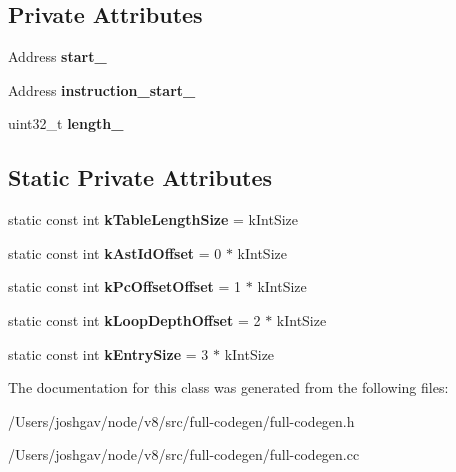 \subsection*{Private Attributes}
\begin{DoxyCompactItemize}
\item 
Address {\bfseries start\+\_\+}\hypertarget{classv8_1_1internal_1_1_back_edge_table_a86e3b0df2bfec3bf09926f74e6f195f7}{}\label{classv8_1_1internal_1_1_back_edge_table_a86e3b0df2bfec3bf09926f74e6f195f7}

\item 
Address {\bfseries instruction\+\_\+start\+\_\+}\hypertarget{classv8_1_1internal_1_1_back_edge_table_ac8756e080b323779682b70c98dc1fc76}{}\label{classv8_1_1internal_1_1_back_edge_table_ac8756e080b323779682b70c98dc1fc76}

\item 
uint32\+\_\+t {\bfseries length\+\_\+}\hypertarget{classv8_1_1internal_1_1_back_edge_table_aba88bdc9f658e964e5a8235a7e0a7a93}{}\label{classv8_1_1internal_1_1_back_edge_table_aba88bdc9f658e964e5a8235a7e0a7a93}

\end{DoxyCompactItemize}
\subsection*{Static Private Attributes}
\begin{DoxyCompactItemize}
\item 
static const int {\bfseries k\+Table\+Length\+Size} = k\+Int\+Size\hypertarget{classv8_1_1internal_1_1_back_edge_table_a1f8f0dc1cc15c8ef32bb1165fdc80dde}{}\label{classv8_1_1internal_1_1_back_edge_table_a1f8f0dc1cc15c8ef32bb1165fdc80dde}

\item 
static const int {\bfseries k\+Ast\+Id\+Offset} = 0 $\ast$ k\+Int\+Size\hypertarget{classv8_1_1internal_1_1_back_edge_table_aad51f56ec7f0d83e8f927664dd29783b}{}\label{classv8_1_1internal_1_1_back_edge_table_aad51f56ec7f0d83e8f927664dd29783b}

\item 
static const int {\bfseries k\+Pc\+Offset\+Offset} = 1 $\ast$ k\+Int\+Size\hypertarget{classv8_1_1internal_1_1_back_edge_table_aae9efd04afbab2db5e68a1cd2f4a7d3b}{}\label{classv8_1_1internal_1_1_back_edge_table_aae9efd04afbab2db5e68a1cd2f4a7d3b}

\item 
static const int {\bfseries k\+Loop\+Depth\+Offset} = 2 $\ast$ k\+Int\+Size\hypertarget{classv8_1_1internal_1_1_back_edge_table_a1847b70e9aacf108f35d3eb16e58a370}{}\label{classv8_1_1internal_1_1_back_edge_table_a1847b70e9aacf108f35d3eb16e58a370}

\item 
static const int {\bfseries k\+Entry\+Size} = 3 $\ast$ k\+Int\+Size\hypertarget{classv8_1_1internal_1_1_back_edge_table_a2e5054f34b30ed4c497e589af53a0db2}{}\label{classv8_1_1internal_1_1_back_edge_table_a2e5054f34b30ed4c497e589af53a0db2}

\end{DoxyCompactItemize}


The documentation for this class was generated from the following files\+:\begin{DoxyCompactItemize}
\item 
/\+Users/joshgav/node/v8/src/full-\/codegen/full-\/codegen.\+h\item 
/\+Users/joshgav/node/v8/src/full-\/codegen/full-\/codegen.\+cc\end{DoxyCompactItemize}
